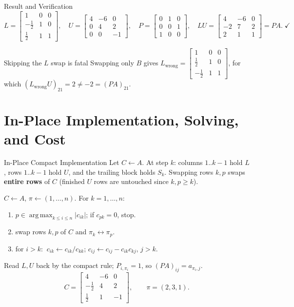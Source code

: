 \documentclass[11pt,aspectratio=169]{beamer}
\newcommand{\mat}[1]{\begin{bmatrix}#1\end{bmatrix}}
\begin{document}
\begin{frame}{Result and Verification}
  \[
    L=\mat{1&0&0\\ -\tfrac12&1&0\\ \tfrac12&1&1},\quad
    U=\mat{4&-6&0\\0&4&2\\0&0&-1},\quad
    P=\mat{0&1&0\\0&0&1\\1&0&0},\quad
    LU=\mat{4&-6&0\\-2&7&2\\2&1&1}=PA.\;\checkmark
  \]
  \begin{alertblock}{Skipping the $L$ swap is fatal}
    Swapping only $B$ gives
    $L_{\text{wrong}}=\mat{1&0&0\\ \tfrac12&1&0\\ -\tfrac12&1&1}$, for which
    $(L_{\text{wrong}}U)_{21}=2\neq-2=(PA)_{21}$.
  \end{alertblock}
\end{frame}

\section{In-Place Implementation, Solving, and Cost}

\begin{frame}{In-Place Compact Implementation}
  \small
  Let $C\gets A$. At step $k$: columns $1..k-1$ hold $L$, rows $1..k-1$ hold $U$, and the
  trailing block holds $S_k$. Swapping rows $k,p$ swaps \textbf{entire rows} of $C$
  (finished $U$ rows are untouched since $k,p\ge k$).
  \medskip

  $C\gets A$, $\pi\gets(1,\dots,n)$. For $k=1,\dots,n$:
  \begin{enumerate}
    \item $p\in\operatorname{arg\,max}_{k\le i\le n}|c_{ik}|$; if $c_{pk}=0$, stop.
    \item swap rows $k,p$ of $C$ and $\pi_k\leftrightarrow\pi_p$.
    \item for $i>k$: $\ c_{ik}\gets c_{ik}/c_{kk}$;\;
      $c_{ij}\gets c_{ij}-c_{ik}c_{kj}$, $j>k$.
  \end{enumerate}
  Read $L,U$ back by the compact rule; $P_{i,\pi_i}=1$, so $(PA)_{ij}=a_{\pi_i,j}$.
  \[
    C=\mat{4&-6&0\\ -\tfrac12&4&2\\ \tfrac12&1&-1},\qquad \pi=(2,3,1).
  \]
\end{frame}
\end{document}
